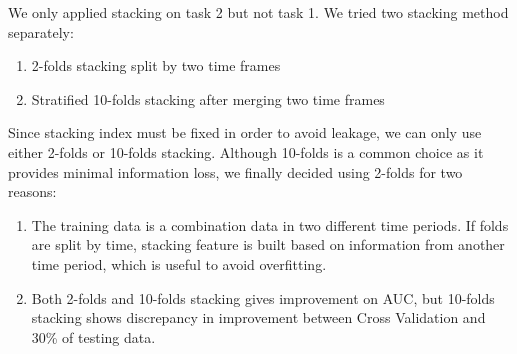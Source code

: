 \documentclass[a4paper]{llncs}
\begin{document}
%
%
%
%
%
%
%
%
%
%
%



We only applied stacking on task 2 but not task 1.
We tried two stacking method separately:
\begin{enumerate}
 \item 2-folds stacking split by two time frames

 \item Stratified 10-folds stacking after merging two time frames
\end{enumerate}

Since stacking index must be fixed in order to avoid leakage, we can only use either 2-folds or 10-folds stacking.
Although 10-folds is a common choice as it provides minimal information loss, we finally decided using 2-folds for two reasons:
\begin{enumerate}
 \item The training data is a combination data in two different time periods. If folds are split by time,
  stacking feature is built based on information from another time period, which is useful to avoid overfitting.

 \item Both 2-folds and 10-folds stacking gives improvement on AUC, but 10-folds stacking shows
  discrepancy in improvement between Cross Validation and 30\% of testing data.
\end{enumerate}
\end{document}
